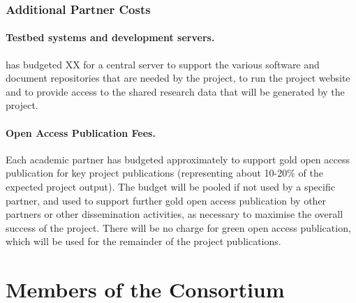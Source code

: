 \documentclass[a4paper,11pt]{article}
\begin{document}

\subsubsection{Additional Partner Costs}
\vspace{-6pt}

\paragraph{Testbed systems and development servers.}
\SAshort{} has budgeted \euros{} XX for a central
server to support the various software and document repositories that are needed by the project, to run the project website and to provide access
to the shared research data that will be generated by the project.

\paragraph{Open Access Publication Fees.}
Each academic partner has budgeted approximately  to
support gold open access publication for key project publications
(representing about 10-20\% of the expected project output).  The
budget will be pooled if not used by a specific partner, and used to
support further gold open access publication by other partners or
other dissemination activities, as necessary to maximise the overall
success of the project.  There will be no charge for green open access
publication, which will be used for the remainder of the project
publications.

\label{bibliography}







\newpage


\section{Members of the Consortium}
\end{document}
